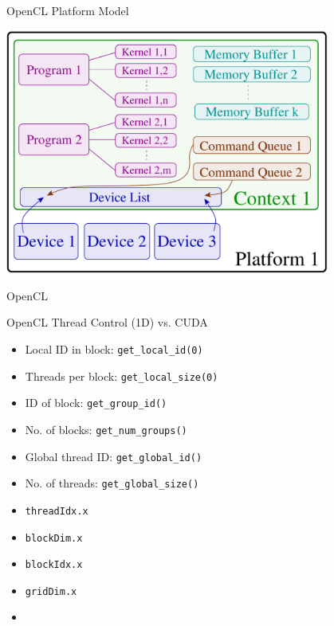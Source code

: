 \begin{frame}{OpenCL Platform Model}
 \begin{center}
   \includegraphics[width=0.80\textwidth]{figures/opencl-full.pdf}
 \end{center}
\end{frame}



\begin{frame}{OpenCL}

\begin{minipage}{0.7\textwidth}
\begin{block}{OpenCL Thread Control (1D) vs. CUDA}
 \begin{itemize}
  \item Local ID in block: \lstinline|get_local_id(0)|
  \item Threads per block: \lstinline|get_local_size(0)|
  \item ID of block: \lstinline|get_group_id()|
  \item No. of blocks: \lstinline|get_num_groups()|
  \item Global thread ID: \lstinline|get_global_id()|
  \item No. of threads: \lstinline|get_global_size()|
 \end{itemize}
\end{block}
\end{minipage}
\begin{minipage}{0.25\textwidth}
\begin{block}{}
 \begin{itemize}
  \item {\color{darkgreen}\lstinline|threadIdx.x|}
  \item {\color{darkgreen}\lstinline|blockDim.x|}
  \item {\color{darkgreen}\lstinline|blockIdx.x|}
  \item {\color{darkgreen}\lstinline|gridDim.x|}
  \item
 \end{itemize}
\end{block}
\vspace*{0.1cm}
\end{minipage}

\end{frame}
